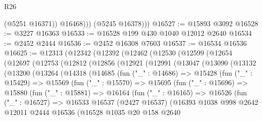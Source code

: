 \begin{lexlean}{R26}
\begin{coremodule}
                (@5251 @16371))
              @16468)))
        (@5245 @16378)))
@16527 := @15893 @3092
@16528 := @3227 @16363
@16533 := @16528 @199 @430 @1040 @12012 @2640
@16534 := @2452 @2444
@16536 := @2452 @16308 @7603
@16537 := @16534 @16536
@16625 := @12313
    (@12342
      (@12392
        (@12462
          (@12530
            (@12599
              (@12654
                (@12697
                  (@12753
                    (@12812
                      (@12856
                        (@12921
                          (@12991
                            (@13047
                              (@13090
                                (@13132
                                  (@13200
                                    (@13264
                                      (@14318
                                        (@14685
                                          (fun ("_" : @14686) =>
                                          @15428
                                            (fun ("_" : @15429) =>
                                            @15569
                                              (fun ("_" : @15570) =>
                                              @15695
                                                (fun ("_" : @15696) =>
                                                @15880
                                                  (fun ("_" : @15881) =>
                                                  @16164
                                                    (fun ("_" : @16165) =>
                                                    @16526
                                                      (fun ("_" : @16527) =>
                                                      @16533
                                                        @16537
                                                        (@2427 @16537)
                                                        (@16393
                                                          @1038
                                                          @998
                                                          @2642
                                                          @12011
                                                          @2444
                                                          @16536
                                                          (@16528
                                                            @1035
                                                            @20
                                                            @158
                                                            @2640

\end{coremodule}
\end{lexlean}
